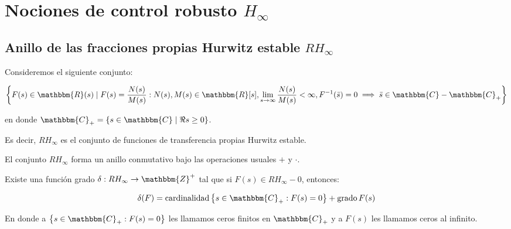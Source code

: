 
\chapter{Nociones de control robusto $H_{\infty}$}


    \section{Anillo de las fracciones propias Hurwitz estable $RH_{\infty}$}

        Consideremos el siguiente conjunto:

        \begin{equation}
            \left\{ F(s) \in \mathbbm{R}(s) \mid F(s) = \frac{N(s)}{M(s)} : N(s), M(s) \in \mathbbm{R}[s], \lim_{s \to \infty} \frac{N(s)}{M(s)} < \infty, F^{-1}(\bar{s}) = 0 \implies \bar{s} \in \mathbbm{C} - \mathbbm{C}_+ \right\}
        \end{equation}

        en donde $\mathbbm{C}_+ = \left\{ s \in \mathbbm{C} \mid \Re{s} \ge 0 \right\}$.

        Es decir, $RH_{\infty}$ es el conjunto de funciones de transferencia propias Hurwitz estable.

        \begin{definicion}
            El conjunto $RH_{\infty}$ forma un anillo conmutativo bajo las operaciones usuales $+$ y $\cdot$.
        \end{definicion}

        \begin{definicion}
            Existe una función grado $\delta: RH_{\infty} \to \mathbbm{Z}^+$ tal que si $F(s) \in RH_{\infty} - {0}$, entonces:

            \begin{equation}
                \delta(F) = \cardinalidad{\left\{ s \in \mathbbm{C}_+ : F(s) = 0 \right\}} + \grado{F(s)}
            \end{equation}

            En donde a $\left\{ s \in \mathbbm{C}_+ : F(s) = 0 \right\}$ les llamamos ceros finitos en $\mathbbm{C}_+$ y a $F(s)$ les llamamos ceros al infinito.
        \end{definicion}

